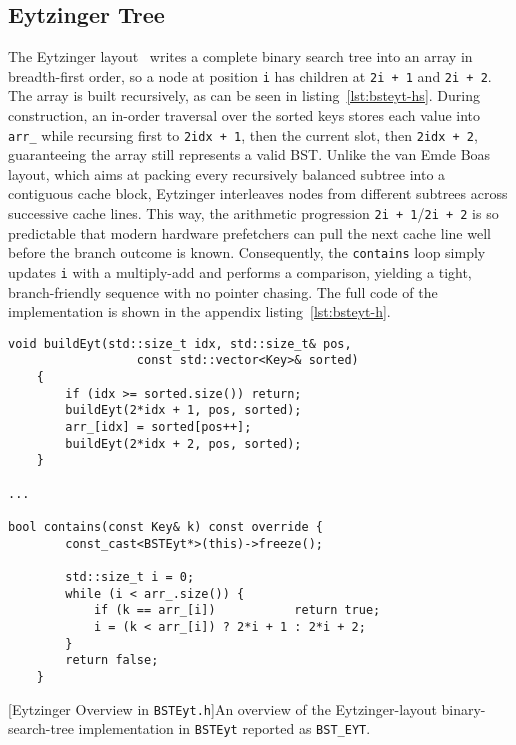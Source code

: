 \documentclass{article}
\begin{document}
\subsection{Eytzinger Tree}
\label{sec:eyplain}
The Eytzinger layout~\cite{khuong2017arraylayoutscomparisonbasedsearching} writes a complete binary search tree into an array in breadth-first order, so a node at position \texttt{i} has children at \texttt{2i + 1} and \texttt{2i + 2}. The array is built recursively, as can be seen in listing~\ref{lst:bsteyt-hs}. During construction, an in-order traversal over the sorted keys stores each value into \texttt{arr\_} while recursing first to \texttt{2idx + 1}, then the current slot, then \texttt{2idx + 2}, guaranteeing the array still represents a valid BST. Unlike the van Emde Boas layout, which aims at packing every recursively balanced subtree into a contiguous cache block, Eytzinger interleaves nodes from different subtrees across successive cache lines. This way, the arithmetic progression \texttt{2i + 1}/\texttt{2i + 2} is so predictable that modern hardware prefetchers can pull the next cache line well before the branch outcome is known. Consequently, the \texttt{contains} loop simply updates \texttt{i} with a multiply-add and performs a comparison, yielding a tight, branch-friendly sequence with no pointer chasing. The full code of the implementation is shown in the appendix listing~\ref{lst:bsteyt-h}.

\begin{lstlisting}
void buildEyt(std::size_t idx, std::size_t& pos,
                  const std::vector<Key>& sorted)
    {
        if (idx >= sorted.size()) return;
        buildEyt(2*idx + 1, pos, sorted);
        arr_[idx] = sorted[pos++];
        buildEyt(2*idx + 2, pos, sorted);
    }

...

bool contains(const Key& k) const override {
        const_cast<BSTEyt*>(this)->freeze();

        std::size_t i = 0;
        while (i < arr_.size()) {
            if (k == arr_[i])           return true;
            i = (k < arr_[i]) ? 2*i + 1 : 2*i + 2;
        }
        return false;
    }
\end{lstlisting}
[Eytzinger Overview in \texttt{BSTEyt.h}]{An overview of the Eytzinger-layout binary-search-tree implementation in \texttt{BSTEyt} reported as \texttt{BST\_EYT}.}
\label{lst:bsteyt-hs}
\end{document}
